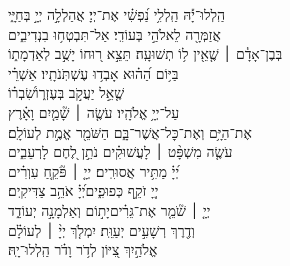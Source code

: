 \documentclass[twoside, openany, parskip=half, 11pt]{book}
\begin{document}
\begin{narrow}

הַֽלְלוּ־יָ֡הּ\hfill \break
 הַֽלְלִ֥י נַ֝פְשִׁ֗י אֶת־יְיָ׃ \hfill
 אֲהַלְלָ֣ה יְיָ֣ בְּחַיָּ֑י \\ אֲזַמְּרָ֖ה לֵאלֹהַ֣י בְּעוֹדִֽי׃ \hfill
 אַל־תִּבְטְח֥וּ בִנְדִיבִ֑ים \\ בְּבֶן־אָדָ֓ם ׀ שֶׁ֤אֵ֖ין ל֥וֹ תְשׁוּעָֽה׃ \hfill
 תֵּצֵ֣א ר֭וּחוֹ יָשֻׁ֣ב לְאַדְמָת֑וֹ \\ בַּיּ֥וֹם הַ֝ה֗וּא אָבְד֥וּ עֶשְׁתֹּֽנֹתָֽיו׃ \hfill
 אַשְׁרֵ֗י\\ שֶׁ֤אֵ֣ל יַעֲקֹ֣ב בְּעֶזְר֑וֹ\hfill שִׂ֝בְר֗וֹ\\ עַל־יְיָ֥ אֱלֹהָֽיו׃ \hfill
 עֹשֶׂ֤ה ׀ שָׁ֘מַ֤יִם וָאָ֗רֶץ\\ אֶת־הַיָּ֥ם וְאֶת־כׇּל־אֲשֶׁר־בָּ֑ם \hfill הַשֹּׁמֵ֖ר אֱמֶ֣ת לְעוֹלָֽם׃ \\
 עֹשֶׂ֤ה מִשְׁפָּ֨ט ׀ לָעֲשׁוּקִ֗ים \hfill נֹתֵ֣ן לֶ֭חֶם לָרְעֵבִ֑ים\\ יְ֝יָ֗ מַתִּ֥יר אֲסוּרִֽים׃ \hfill
 יְיָ֤ ׀ פֹּ֘קֵ֤חַ עִוְרִ֗ים\\ יְיָ֭ זֹקֵ֣ף כְּפוּפִ֑ים\hfill יְ֝יָ֗ אֹהֵ֥ב צַדִּיקִֽים׃ \\
 יְיָ֤ ׀ שֹׁ֘מֵ֤ר אֶת־גֵּרִ֗ים\hfill יָת֣וֹם וְאַלְמָנָ֣ה יְעוֹדֵ֑ד\\ וְדֶ֖רֶךְ רְשָׁעִ֣ים יְעַוֵּֽת׃ \hfill
 יִמְלֹ֤ךְ יְיָ֨ ׀ לְעוֹלָ֗ם\\ אֱלֹהַ֣יִךְ צִ֭יּוֹן לְדֹ֥ר וָדֹ֗ר \hfill הַֽלְלוּ־יָֽהּ׃ \\



\end{narrow}
\end{document}
